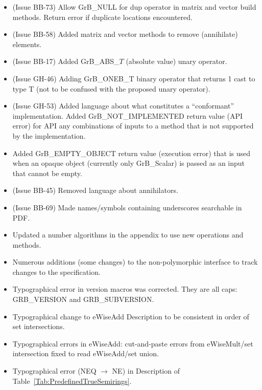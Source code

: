 \begin{itemize}
\item (Issue BB-73) Allow {\sf GrB\_NULL} for dup operator in matrix and vector {\sf build} methods.  Return error if duplicate locations encountered.
\item (Issue BB-58) Added matrix and vector methods to remove (annihilate) elements.
\item (Issue BB-17) Added {\sf GrB\_ABS\_$T$} (absolute value) unary operator.
\item (Issue GH-46) Adding {\sf GrB\_ONEB\_T} binary operator that returns 1 cast to type T (not to be confused with the proposed unary operator).
\item (Issue GH-53) Added language about what constitutes a ``conformant'' implementation.  Added {\sf GrB\_NOT\_IMPLEMENTED} return value (API error) for API any combinations of inputs to a method that is not supported by the implementation.
\item Added {\sf GrB\_EMPTY\_OBJECT} return value (execution error) that is used when an opaque object (currently only {\sf GrB\_Scalar}) is passed as an input that cannot be empty.
\item (Issue BB-45) Removed language about annihilators.
\item (Issue BB-69) Made names/symbols containing underscores searchable in PDF.
\item Updated a number algorithms in the appendix to use new operations and methods.
\item Numerous additions (some changes) to the non-polymorphic interface to track changes to the specification.
\item Typographical error in version macros was corrected.  They are all caps: {\sf GRB\_VERSION} and {\sf GRB\_SUBVERSION}.
\item Typographical change to eWiseAdd Description to be consistent in order of set intersections.
\item Typographical errors in eWiseAdd: cut-and-paste errors from eWiseMult/set intersection fixed to read eWiseAdd/set union.
\item Typographical error ({\sf NEQ} $\rightarrow$ {\sf NE}) in Description of Table~\ref{Tab:PredefinedTrueSemirings}.
\end{itemize}


